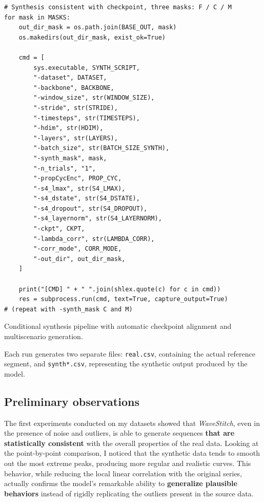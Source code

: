 \begin{listing}[H]
\begin{verbatim}
# Synthesis consistent with checkpoint, three masks: F / C / M
for mask in MASKS:
    out_dir_mask = os.path.join(BASE_OUT, mask)
    os.makedirs(out_dir_mask, exist_ok=True)

    cmd = [
        sys.executable, SYNTH_SCRIPT,
        "-dataset", DATASET,
        "-backbone", BACKBONE,
        "-window_size", str(WINDOW_SIZE),
        "-stride", str(STRIDE),
        "-timesteps", str(TIMESTEPS),
        "-hdim", str(HDIM),
        "-layers", str(LAYERS),
        "-batch_size", str(BATCH_SIZE_SYNTH),
        "-synth_mask", mask,
        "-n_trials", "1",
        "-propCycEnc", PROP_CYC,
        "-s4_lmax", str(S4_LMAX),
        "-s4_dstate", str(S4_DSTATE),
        "-s4_dropout", str(S4_DROPOUT),
        "-s4_layernorm", str(S4_LAYERNORM),
        "-ckpt", CKPT,
        "-lambda_corr", str(LAMBDA_CORR),
        "-corr_mode", CORR_MODE,
        "-out_dir", out_dir_mask,
    ]

    print("[CMD] " + " ".join(shlex.quote(c) for c in cmd))
    res = subprocess.run(cmd, text=True, capture_output=True)
# (repeat with -synth_mask C and M)
\end{verbatim}
\caption{Conditional synthesis pipeline with automatic checkpoint alignment and multiscenario generation.}
\end{listing}

Each run generates two separate files: \texttt{real.csv}, containing the actual reference segment, and \texttt{synth*.csv}, representing the synthetic output produced by the model.

\subsection{Preliminary observations}

The first experiments conducted on my datasets showed that \emph{WaveStitch}, even in the presence of noise and outliers, is able to generate sequences \textbf{that are statistically consistent} with the overall properties of the real data.  
Looking at the point-by-point comparison, I noticed that the synthetic data tends to smooth out the most extreme peaks, producing more regular and realistic curves.  
This behavior, while reducing the local linear correlation with the original series, actually confirms the model’s remarkable ability to \textbf{generalize plausible behaviors} instead of rigidly replicating the outliers present in the source data.  

